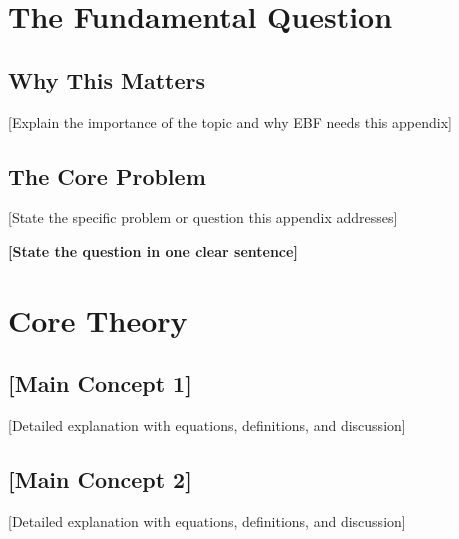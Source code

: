 \section{The Fundamental Question}
\label{sec:[code]-fundamental}


\subsection{Why This Matters}

[Explain the importance of the topic and why EBF needs this appendix]

\subsection{The Core Problem}

[State the specific problem or question this appendix addresses]

\begin{tcolorbox}[colback=red!5!white, colframe=red!75!black, 
    title=The Fundamental Question]
\textbf{[State the question in one clear sentence]}
\end{tcolorbox}


\section{Core Theory}
\label{sec:[code]-theory}


\subsection{[Main Concept 1]}

[Detailed explanation with equations, definitions, and discussion]

\subsection{[Main Concept 2]}

[Detailed explanation with equations, definitions, and discussion]


